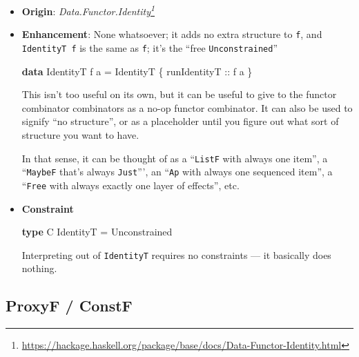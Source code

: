 \documentclass[]{article}
\newenvironment{Shaded}{}{}
\newcommand{\DataTypeTok}[1]{\textcolor[rgb]{0.56,0.13,0.00}{#1}}
\newcommand{\KeywordTok}[1]{\textcolor[rgb]{0.00,0.44,0.13}{\textbf{#1}}}
\newcommand{\NormalTok}[1]{#1}
\newcommand{\OtherTok}[1]{\textcolor[rgb]{0.00,0.44,0.13}{#1}}
\renewcommand{\href}[2]{#2\footnote{\url{#1}}}
\begin{document}
\begin{itemize}
\item
  \textbf{Origin}:
  \emph{\href{https://hackage.haskell.org/package/base/docs/Data-Functor-Identity.html}{Data.Functor.Identity}}
\item
  \textbf{Enhancement}: None whatsoever; it adds no extra structure to
  \texttt{f}, and \texttt{IdentityT\ f} is the same as \texttt{f}; it's the
  ``free \texttt{Unconstrained}''

\begin{Shaded}
\begin{Highlighting}[]
\KeywordTok{data} \DataTypeTok{IdentityT}\NormalTok{ f a }\OtherTok{=} \DataTypeTok{IdentityT}\NormalTok{ \{}\OtherTok{ runIdentityT ::}\NormalTok{ f a \}}
\end{Highlighting}
\end{Shaded}

  This isn't too useful on its own, but it can be useful to give to the functor
  combinator combinators as a no-op functor combinator. It can also be used to
  signify ``no structure'', or as a placeholder until you figure out what sort
  of structure you want to have.

  In that sense, it can be thought of as a ``\texttt{ListF} with always one
  item'', a ``\texttt{MaybeF} that's always \texttt{Just}''', an ``\texttt{Ap}
  with always one sequenced item'', a ``\texttt{Free} with always exactly one
  layer of effects'', etc.
\item
  \textbf{Constraint}

\begin{Shaded}
\begin{Highlighting}[]
\KeywordTok{type} \DataTypeTok{C} \DataTypeTok{IdentityT} \OtherTok{=} \DataTypeTok{Unconstrained}
\end{Highlighting}
\end{Shaded}

  Interpreting out of \texttt{IdentityT} requires no constraints --- it
  basically does nothing.
\end{itemize}

\hypertarget{proxyf-constf}{%
\subsection{ProxyF / ConstF}\label{proxyf-constf}}
\end{document}
